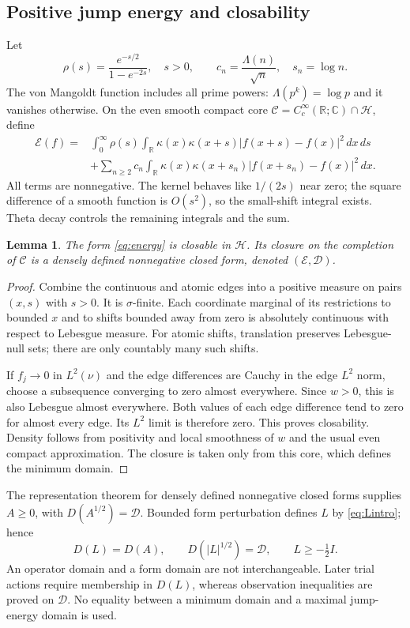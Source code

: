 \documentclass[11pt,a4paper]{article}
\numberwithin{equation}{section}
\newtheorem{lemma}[theorem]{Lemma}
\theoremstyle{definition}\newtheorem{definition}[theorem]{Definition}
\theoremstyle{remark}\newtheorem{remark}[theorem]{Remark}
\newcommand{\HH}{\mathcal H}
\newcommand{\DD}{\mathcal D}
\newcommand{\EE}{\mathcal E}
\newcommand{\R}{\mathbb R}
\newcommand{\C}{\mathbb C}
\begin{document}
\subsection{Positive jump energy and closability}
Let
\begin{equation}\label{eq:kernel}
 \rho(s)=\frac{e^{-s/2}}{1-e^{-2s}},\quad s>0,
 \qquad c_n=\frac{\Lambda(n)}{\sqrt n},\quad s_n=\log n.
\end{equation}
The von Mangoldt function includes all prime powers: $\Lambda(p^k)=\log p$ and it vanishes otherwise. On the even smooth compact core $\mathcal C=C_c^\infty(\R;\C)\cap\HH$, define
\begin{align}\label{eq:energy}
 \EE(f)={}&\int_0^\infty\rho(s)\int_{\R}\kappa(x)\kappa(x+s)
       |f(x+s)-f(x)|^2\,dx\,ds\nonumber\\
 &+\sum_{n\ge2}c_n\int_{\R}\kappa(x)\kappa(x+s_n)
       |f(x+s_n)-f(x)|^2\,dx.
\end{align}
All terms are nonnegative. The kernel behaves like $1/(2s)$ near zero; the square difference of a smooth function is $O(s^2)$, so the small-shift integral exists. Theta decay controls the remaining integrals and the sum.

\begin{lemma}\label{lem:closure}
The form \eqref{eq:energy} is closable in $\HH$. Its closure on the completion of $\mathcal C$ is a densely defined nonnegative closed form, denoted $(\EE,\DD)$.
\end{lemma}
\begin{proof}
Combine the continuous and atomic edges into a positive measure on pairs $(x,s)$ with $s>0$. It is $\sigma$-finite. Each coordinate marginal of its restrictions to bounded $x$ and to shifts bounded away from zero is absolutely continuous with respect to Lebesgue measure. For atomic shifts, translation preserves Lebesgue-null sets; there are only countably many such shifts.

If $f_j\to0$ in $L^2(\nu)$ and the edge differences are Cauchy in the edge $L^2$ norm, choose a subsequence converging to zero almost everywhere. Since $w>0$, this is also Lebesgue almost everywhere. Both values of each edge difference tend to zero for almost every edge. Its $L^2$ limit is therefore zero. This proves closability. Density follows from positivity and local smoothness of $w$ and the usual even compact approximation. The closure is taken only from this core, which defines the minimum domain.
\end{proof}

The representation theorem for densely defined nonnegative closed forms supplies $A\ge0$, with $D(A^{1/2})=\DD$. Bounded form perturbation defines $L$ by \eqref{eq:Lintro}; hence
\begin{equation}\label{eq:domains}
 D(L)=D(A),\qquad D(|L|^{1/2})=\DD,
 \qquad L\ge-\tfrac12I.
\end{equation}
An operator domain and a form domain are not interchangeable. Later trial actions require membership in $D(L)$, whereas observation inequalities are proved on $\DD$. No equality between a minimum domain and a maximal jump-energy domain is used.
\end{document}

